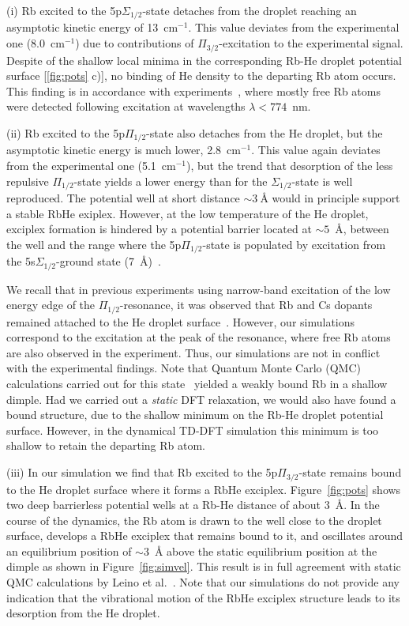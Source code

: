 (i) Rb excited to the 5p$\Sigma_{1/2}$-state detaches from the droplet reaching an asymptotic kinetic energy of 13~cm$^{-1}$. This value deviates from the experimental one (8.0~cm$^{-1}$) due to contributions of $\Pi_{3/2}$-excitation to the experimental signal. Despite of the shallow local minima in the corresponding Rb-He droplet potential surface [\ref{fig:pots} c)], no binding of He density to the departing Rb atom occurs. This finding is in accordance with experiments~\cite{Bruehl:2001,Droppelmann:2004,Fechner:2012}, where mostly free Rb atoms were detected following excitation at wavelengths $\lambda<774$~nm. 

(ii) Rb excited to the 5p$\Pi_{1/2}$-state also detaches from the He droplet, but the asymptotic kinetic energy is much lower, 2.8~cm$^{-1}$. 
This value again deviates from the experimental one (5.1~cm$^{-1}$), but the trend that desorption of the less repulsive $\Pi_{1/2}$-state yields a lower energy than for the $\Sigma_{1/2}$-state is well reproduced. The potential well at short distance $\sim 3~$\AA{} would in principle support a stable RbHe exiplex. However, at the low temperature of the He droplet, exciplex formation is hindered by a potential barrier located at $\sim 5$~\AA{}, between the well and the range where the 5p$\Pi_{1/2}$-state is populated by excitation from the 5s$\Sigma_{1/2}$-ground state (7~\AA{})~\cite{Reho2:2000,Bruehl:2001,Hirano:2003}.

We recall that in previous experiments using narrow-band excitation of the low energy edge of the $\Pi_{1/2}$-resonance, it was observed that Rb and Cs dopants remained attached to the He droplet surface~\cite{Auboeck:2008}. However, our simulations correspond to the excitation at the peak of the resonance, where free Rb atoms are also observed in the experiment. Thus, our simulations are not in conflict with the experimental findings. Note that Quantum Monte Carlo (QMC) calculations carried out for this state~\cite{Leino:2008} yielded a weakly bound Rb in a shallow dimple. Had we carried out a {\it static} DFT relaxation, we would also have found a bound structure, due to the shallow minimum on the Rb-He droplet potential surface. However, in the dynamical TD-DFT simulation this minimum is too shallow to retain the departing Rb atom.

(iii) In our simulation we find that Rb excited to the 5p$\Pi_{3/2}$-state remains bound to the He droplet surface where it forms a RbHe exciplex. Figure~\ref{fig:pots} shows two deep barrierless potential wells at a Rb-He distance of about 3~\AA{}. In the course of the dynamics, the Rb atom is drawn to the well close to the droplet surface, develops a RbHe exciplex that remains bound to it, and oscillates around an equilibrium position of $\sim 3$~\AA{} above the static equilibrium position at the dimple as shown in Figure~\ref{fig:simvel}. This result is in full agreement with static QMC calculations by Leino et al.~\cite{Leino:2011}. Note that our simulations do not provide any indication that the vibrational motion of the RbHe exciplex structure leads to its desorption from the He droplet. 
	

